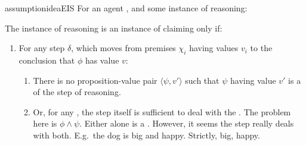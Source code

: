 \begin{note}
  \begin{restatable}{assumption}{ideaEIS}
    \label{idea:CS:B}
    \label{assumption:CS}
    For an agent \vAgent{}, and some instance of reasoning:

    The instance of reasoning is an instance of claiming \support{} only if:
    \begin{enumerate}
    \item
      \label{idea:CS:B:step}
      For any step \(\delta\), which moves from premises \(\chi_{i}\) having values \(v_{i}\) to the conclusion that \(\phi\) has value \(v\):
      \begin{enumerate}[label=\alph*., ref=(\alph*)]
      \item
        There is no proposition-value pair \(\langle \psi, v' \rangle\) such that \(\psi\) having value \(v'\) is a \emph{\requ{}} of the step of reasoning.
      \item
        Or, for any \requ{}, the step itself is sufficient to deal with the \requ{}. {\color{red} The problem here is \(\phi \land \psi\). Either alone is a \requ{}. However, it seems the step really deals with both.}
        E.g.\ the dog is big and happy.
        Strictly, big, happy.


\end{enumerate}
\end{enumerate}
\end{restatable}
\end{note}
